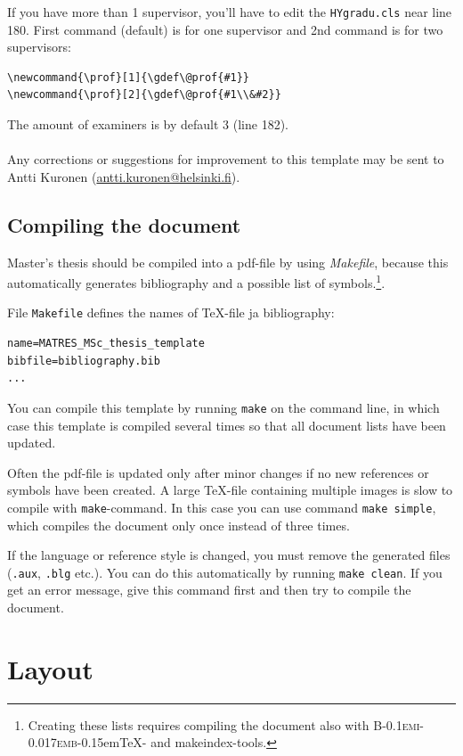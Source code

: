 \documentclass[english,twoside,openright]{HYgradu}
\begin{document}
If you have more than 1 supervisor, you'll have to edit the
\texttt{HYgradu.cls} near line 180. First command (default) is for one
supervisor and 2nd command is for two supervisors:
\begin{verbatim}
\newcommand{\prof}[1]{\gdef\@prof{#1}}
\newcommand{\prof}[2]{\gdef\@prof{#1\\&#2}}
\end{verbatim}
The amount of examiners is by default 3 (line 182).
\\\\
Any corrections or suggestions for improvement to this template may be
sent to Antti Kuronen
(\href{mailto:antti.kuronen@helsinki.fi}{antti.kuronen@helsinki.fi}).

\section{Compiling the document}
\label{sec:compile}

Master's thesis should be compiled into a pdf-file by using
\emph{Makefile}, because this automatically generates bibliography and
a possible list of symbols.\footnote{Creating these lists requires
  compiling the document also with
  \textsc{B\kern-0.1emi\kern-0.017emb}\kern-0.15em\TeX- and
  makeindex-tools.}.

File \texttt{Makefile} defines the names of \TeX-file ja bibliography:
\begin{verbatim}
name=MATRES_MSc_thesis_template
bibfile=bibliography.bib
...
\end{verbatim}
You can compile this template by running \texttt{make} on the command
line, in which case this template is compiled several times so that
all document lists have been updated.

Often the pdf-file is updated only after minor changes if no new
references or symbols have been created. A large \TeX-file containing
multiple images is slow to compile with \texttt{make}-command.  In
this case you can use command \texttt{make simple}, which compiles the
document only once instead of three times.

If the language or reference style is changed, you must remove the
generated files (\texttt{.aux}, \texttt{.blg} etc.). You can do this
automatically by running \texttt{make clean}. If you get an error
message, give this command first and then try to compile the document.

\chapter{Layout}
\end{document}
